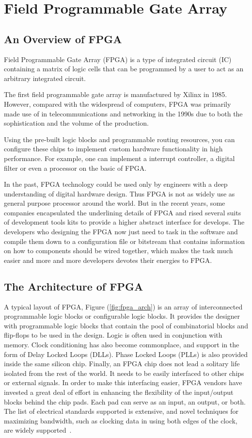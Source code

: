\section{Field Programmable Gate Array}

\subsection{An Overview of FPGA}
Field Programmable Gate Array (FPGA) is a type of integrated circuit (IC)
containing a matrix of logic cells that can be programmed by a user to act
as an arbitrary integrated circuit.

The first field programmable gate array is manufactured by Xilinx
in 1985. However, compared with the widespread of computers, FPGA
was primarily made use of in telecommunications and networking in
the 1990s due to both the sophistication and the volume of the production.

Using the pre-built logic blocks and
programmable routing resources, you can configure these chips to implement
custom hardware functionality in high performance. For example, one can implement a
interrupt controller, a digital filter or even a processor on the basic of
FPGA.

In the past, FPGA technology could be used only by
engineers with a deep understanding of digital hardware design. Thus FPGA is
not as widely use as general purpose processor around the world. But in
the recent years, some companies encapsulated the underlining details of
FPGA and rised several suits of development tools kits to provide a higher
abstract interface for develops. The developers who designing the FPGA now
just need to task in the software and compile them down to a configuration
file or bitstream that contains information on how to components should be
wired together, which makes the task much easier and more and more
developers devotes their energies to FPGA.

\subsection{The Architecture of FPGA}

A typical layout of FPGA, Figure (\ref{fig:fpga_arch}) is an array of
interconnected programmable logic blocks or configurable logic blocks. It
provides the designer with programmable logic blocks that contain the pool
of combinatorial blocks and flip-flops to be used in the design. Logic is
often used in conjunction with memory. Clock conditioning has also become
commonplace, and support in the form of Delay Locked Loops (DLLs). Phase
Locked Loops (PLLs) is also provided inside the same silicon chip. Finally,
an FPGA chip does not lead a solitary life isolated from the rest of the
world. It needs to be easily interfaced to other chips or external signals.
In order to make this interfacing easier, FPGA vendors have invested a
great deal of effort in enhancing the flexibility of the input/output
blocks behind the chip pads. Each pad can serve as an input, an output, or
both. The list of electrical standards supported is extensive, and novel
techniques for maximizing bandwidth, such as clocking data in using both
edges of the clock, are widely supported~\cite{fpgaintro}.

